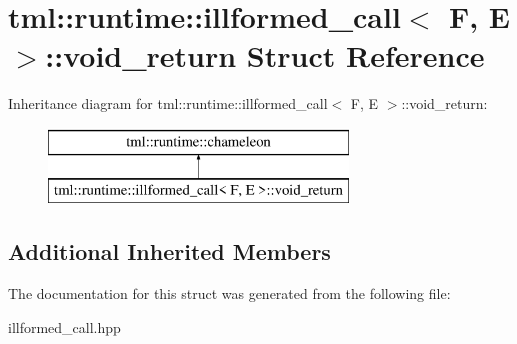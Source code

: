 \hypertarget{structtml_1_1runtime_1_1illformed__call_1_1void__return}{\section{tml\+:\+:runtime\+:\+:illformed\+\_\+call$<$ F, E $>$\+:\+:void\+\_\+return Struct Reference}
\label{structtml_1_1runtime_1_1illformed__call_1_1void__return}
}
Inheritance diagram for tml\+:\+:runtime\+:\+:illformed\+\_\+call$<$ F, E $>$\+:\+:void\+\_\+return\+:\begin{figure}[H]
\begin{center}
\leavevmode
\includegraphics[height=2.000000cm]{structtml_1_1runtime_1_1illformed__call_1_1void__return}
\end{center}
\end{figure}
\subsection*{Additional Inherited Members}


The documentation for this struct was generated from the following file\+:\begin{DoxyCompactItemize}
\item 
illformed\+\_\+call.\+hpp\end{DoxyCompactItemize}
